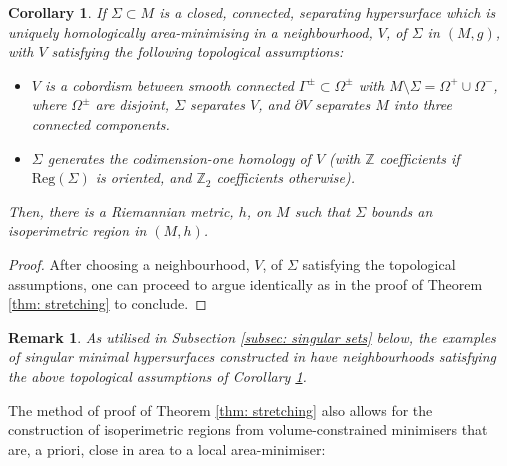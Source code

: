 \documentclass[12pt]{article}
\newtheorem{remark}{Remark}
\newtheorem{corollary}{Corollary}
\begin{document}
\begin{corollary}\label{cor: singular stretching}
    If $\Sigma \subset M$ is a closed, connected, separating hypersurface which is uniquely homologically area-minimising in a neighbourhood, $V$, of $\Sigma$ in $(M,g)$, with $V$ satisfying the following topological assumptions: 

    \begin{itemize}
        \item $V$ is a cobordism between smooth connected $\Gamma^\pm \subset \Omega^\pm$ with $M \setminus \Sigma = \Omega^+ \cup \Omega^-$, where $\Omega^\pm$ are disjoint, $\Sigma$ separates $V$, and $\partial V$ separates $M$ into three connected components.

        \item $\Sigma$ generates the codimension-one homology of $V$ (with $\mathbb{Z}$ coefficients if $\mathrm{Reg}(\Sigma)$ is oriented, and $\mathbb{Z}_2$ coefficients otherwise).
    \end{itemize}
    Then, there is a Riemannian metric, $h$, on $M$ such that $\Sigma$ bounds an isoperimetric region in $(M,h)$.
\end{corollary}

\begin{proof}
    After choosing a neighbourhood, $V$, of $\Sigma$ satisfying the topological assumptions, one can proceed to argue identically as in the proof of Theorem \ref{thm: stretching} to conclude.
\end{proof}

\begin{remark}
    As utilised in Subsection \ref{subsec: singular sets} below, the examples of singular minimal hypersurfaces constructed in \cite{S00} have neighbourhoods satisfying the above topological assumptions of Corollary \ref{cor: singular stretching}.
\end{remark}

The method of proof of Theorem \ref{thm: stretching} also allows for the construction of isoperimetric regions from volume-constrained minimisers that are, a priori, close in area to a local area-minimiser:
\end{document}
